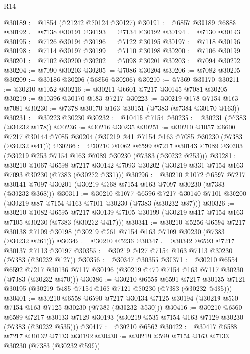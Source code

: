 \begin{lexlean}{R14}
\begin{coremodule}
@30189 := @1854 (@21242 @30124 @30127)
@30191 := @6857 @30189 @6888
@30192 := @7138 @30191
@30193 := @7134 @30192
@30194 := @7130 @30193
@30195 := @7126 @30194
@30196 := @7122 @30195
@30197 := @7118 @30196
@30198 := @7114 @30197
@30199 := @7110 @30198
@30200 := @7106 @30199
@30201 := @7102 @30200
@30202 := @7098 @30201
@30203 := @7094 @30202
@30204 := @7090 @30203
@30205 := @7086 @30204
@30206 := @7082 @30205
@30209 := @30186 @30206 (@6856 @30206)
@30210 := @7369 @30170
@30211 := @30210 @1052
@30216 := @30211 @6601 @7217 @30145 @7081 @30205
@30219 := @10396 @30170 @183 @7217
@30223 := @30219 @178 @7154 @163 @7081
@30230 := @7378 @30170 @163 @30151 (@7383 (@7384 @30170 @163))
@30231 := @30223 @30230
@30232 := @10415 @7154
@30235 := @30231 (@7383 (@30232 @178))
@30236 := @30216 @30235
@30251 := @30210
    @1057
    @6600
    @7217
    @30144
    @7085
    @30204
    (@30219 @41 @7154 @163 @7085 @30230 (@7383 (@30232 @41)))
@30266 := @30210
    @1062
    @6599
    @7217
    @30143
    @7089
    @30203
    (@30219 @253 @7154 @163 @7089 @30230 (@7383 (@30232 @253)))
@30281 := @30210
    @1067
    @6598
    @7217
    @30142
    @7093
    @30202
    (@30219 @331 @7154 @163 @7093 @30230 (@7383 (@30232 @331)))
@30296 := @30210
    @1072
    @6597
    @7217
    @30141
    @7097
    @30201
    (@30219 @368 @7154 @163 @7097 @30230 (@7383 (@30232 @368)))
@30311 := @30210
    @1077
    @6596
    @7217
    @30140
    @7101
    @30200
    (@30219 @87 @7154 @163 @7101 @30230 (@7383 (@30232 @87)))
@30326 := @30210
    @1082
    @6595
    @7217
    @30139
    @7105
    @30199
    (@30219 @417 @7154 @163 @7105 @30230 (@7383 (@30232 @417)))
@30341 := @30210
    @5256
    @6594
    @7217
    @30138
    @7109
    @30198
    (@30219 @261 @7154 @163 @7109 @30230 (@7383 (@30232 @261)))
@30342 := @30210 @5236
@30347 := @30342 @6593 @7217 @30137 @7113 @30197
@30355 := @30219 @127 @7154 @163 @7113 @30230 (@7383 (@30232 @127))
@30356 := @30347 @30355
@30371 := @30210
    @6554
    @6592
    @7217
    @30136
    @7117
    @30196
    (@30219 @470 @7154 @163 @7117 @30230 (@7383 (@30232 @470)))
@30386 := @30210
    @6556
    @6591
    @7217
    @30135
    @7121
    @30195
    (@30219 @485 @7154 @163 @7121 @30230 (@7383 (@30232 @485)))
@30401 := @30210
    @6558
    @6590
    @7217
    @30134
    @7125
    @30194
    (@30219 @530 @7154 @163 @7125 @30230 (@7383 (@30232 @530)))
@30416 := @30210
    @6560
    @6589
    @7217
    @30133
    @7129
    @30193
    (@30219 @535 @7154 @163 @7129 @30230 (@7383 (@30232 @535)))
@30417 := @30210 @6562
@30422 := @30417 @6588 @7217 @30132 @7133 @30192
@30430 := @30219 @599 @7154 @163 @7133 @30230 (@7383 (@30232 @599))

\end{coremodule}
\end{lexlean}

